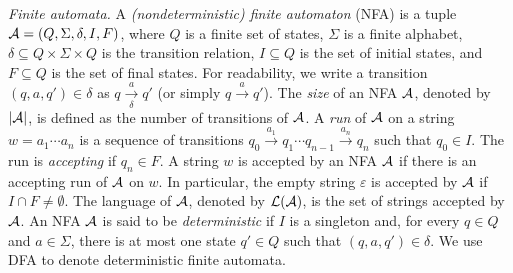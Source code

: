 \medskip
\noindent 
\emph{Finite automata.} 
A \emph{(nondeterministic) finite automaton} (NFA)  is a tuple $\mathcal{A}=(Q, \Sigma, \delta, I, F)$, where $Q$ is a finite set of states, $\Sigma$ is a finite alphabet, $\delta \subseteq Q \times \Sigma \times Q$ is the transition relation, $I \subseteq Q$ is the set of initial states, and $F \subseteq Q$ is the set of final states. For readability, we write a transition $(q, a, q') \in \delta$ as $q \xrightarrow[\delta]{a} q'$ (or simply $q \xrightarrow{a} q'$). %
The \emph{size} of an NFA $\mathcal{A}$, denoted by $|\mathcal{A}|$, is defined as the number of transitions of $\mathcal{A}$.
%
A \emph{run} of $\mathcal{A}$ on a string $w = a_1 \cdots a_n$ is a sequence of transitions $q_0 \xrightarrow{a_1} q_1 \cdots q_{n-1} \xrightarrow{a_n} q_n$ such that $q_0 \in I$. The run is \emph{accepting} if $q_n \in F$.
A string $w$ is accepted by an NFA $\mathcal{A}$ if there is an accepting run of $\mathcal{A}$ on $w$. In particular, the empty string $\varepsilon$ is accepted by $\mathcal{A}$ if $I \cap F \neq \emptyset$. The language of $\mathcal{A}$, denoted by $\mathcal{L}(\mathcal{A})$, is the set of strings accepted by $\mathcal{A}$. 
%
An NFA $\mathcal{A}$ is said to be \emph{deterministic} if $I$ is a singleton and, for every $q \in Q$ and $a \in \Sigma$, there is at most one state $q' \in Q$ such that $(q, a, q') \in \delta$. We use DFA to denote deterministic finite automata. 
%

